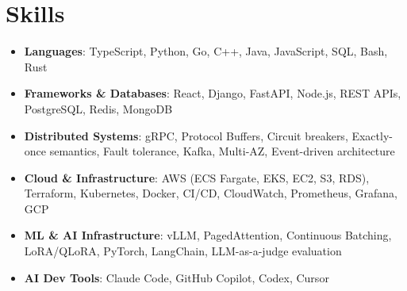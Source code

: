 \documentclass[letterpaper,11pt]{article}
\newcommand{\resumeSubHeadingListStart}{\begin{itemize}[leftmargin=0.15in, label={}]}
\newcommand{\resumeSubHeadingListEnd}{\end{itemize}}
\newcommand{\resumeSkillHeading}[2]{%
  \item\small{\textbf{#1}: #2 \vspace{-9pt}}%
}
\begin{document}
\section{Skills}
  \resumeSubHeadingListStart
    \resumeSkillHeading{Languages}{TypeScript, Python, Go, C++, Java, JavaScript, SQL, Bash, Rust}
    \resumeSkillHeading{Frameworks \& Databases}{React, Django, FastAPI, Node.js, REST APIs, PostgreSQL, Redis, MongoDB}
    \resumeSkillHeading{Distributed Systems}{gRPC, Protocol Buffers, Circuit breakers, Exactly-once semantics, Fault tolerance, Kafka, Multi-AZ, Event-driven architecture}
    \resumeSkillHeading{Cloud \& Infrastructure}{AWS (ECS Fargate, EKS, EC2, S3, RDS), Terraform, Kubernetes, Docker, CI/CD, CloudWatch, Prometheus, Grafana, GCP}
    \resumeSkillHeading{ML \& AI Infrastructure}{vLLM, PagedAttention, Continuous Batching, LoRA/QLoRA, PyTorch, LangChain, LLM-as-a-judge evaluation}
    \resumeSkillHeading{AI Dev Tools}{Claude Code, GitHub Copilot, Codex, Cursor}
  \resumeSubHeadingListEnd
\end{document}
